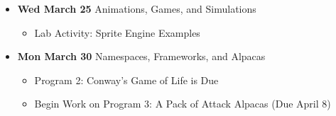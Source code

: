 \begin{itemize}
\begin{itemize}
    \end{itemize}
\item\textbf{Wed March 25} Animations, Games, and Simulations
    \begin{itemize}
        \item Lab Activity: Sprite Engine Examples 
    \end{itemize} 
\item\textbf{Mon March 30} Namespaces, Frameworks, and Alpacas
    \begin{itemize}
        \item Program 2: Conway's Game of Life is Due
        \item Begin Work on Program 3: A Pack of Attack Alpacas (Due April 8)
    \end{itemize}
\end{itemize}

